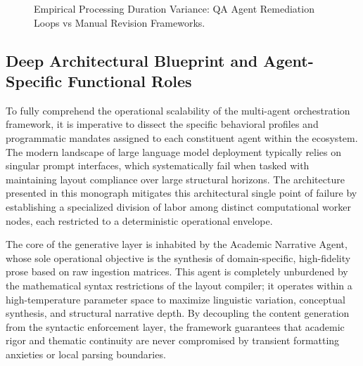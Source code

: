 \begin{figure}[htbp]
\centering
{}
\caption{Empirical Processing Duration Variance: QA Agent Remediation Loops vs Manual Revision Frameworks.}
\label{fig:repair_latency_graph}
\end{figure}

\subsection{Deep Architectural Blueprint and Agent-Specific Functional Roles}
To fully comprehend the operational scalability of the multi-agent orchestration framework, it is imperative to dissect the specific behavioral profiles and programmatic mandates assigned to each constituent agent within the ecosystem. The modern landscape of large language model deployment typically relies on singular prompt interfaces, which systematically fail when tasked with maintaining layout compliance over large structural horizons. The architecture presented in this monograph mitigates this architectural single point of failure by establishing a specialized division of labor among distinct computational worker nodes, each restricted to a deterministic operational envelope.

The core of the generative layer is inhabited by the Academic Narrative Agent, whose sole operational objective is the synthesis of domain-specific, high-fidelity prose based on raw ingestion matrices. This agent is completely unburdened by the mathematical syntax restrictions of the layout compiler; it operates within a high-temperature parameter space to maximize linguistic variation, conceptual synthesis, and structural narrative depth. By decoupling the content generation from the syntactic enforcement layer, the framework guarantees that academic rigor and thematic continuity are never compromised by transient formatting anxieties or local parsing boundaries.

